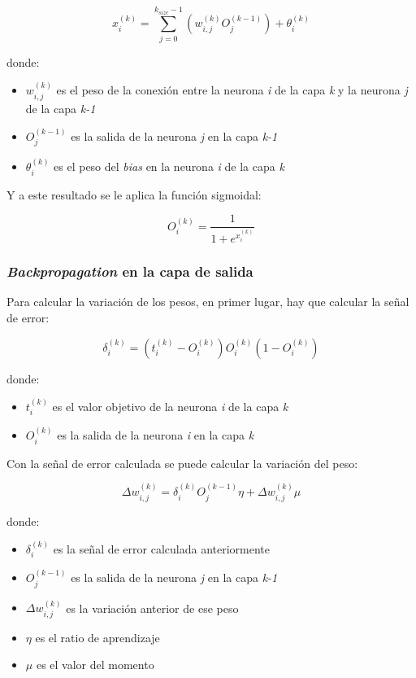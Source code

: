\[ x^{(k)}_{i} = \sum_{j=0}^{k_{size}-1}(w^{(k)}_{i,j} O^{(k-1)}_{j}) + \theta^{(k)}_{i} \]

donde:
\begin{itemize}
	\item $ w^{(k)}_{i,j} $ es el peso de la conexión entre la neurona \textit{i} de la capa \textit{k} y la neurona \textit{j} de la capa \textit{k-1}
	\item $ O^{(k-1)}_{j} $ es la salida de la neurona \textit{j} en la capa \textit{k-1}
	\item $ \theta^{(k)}_{i} $ es el peso del \textit{bias} en la neurona \textit{i} de la capa \textit{k}
\end{itemize}

Y a este resultado se le aplica la función sigmoidal:

\[O^{(k)}_{i} = \dfrac{1}{1 + e^{x^{(k)}_{i}}} \]

\subsubsection{\textit{Backpropagation} en la capa de salida}

Para calcular la variación de los pesos, en primer lugar, hay que calcular la señal de error:

\[ \delta^{(k)}_{i} = (t^{(k)}_{i} - O^{(k)}_{i}) O^{(k)}_{i} (1 - O^{(k)}_{i}) \]

donde:
\begin{itemize}
	\item $ t^{(k)}_{i} $ es el valor objetivo de la neurona \textit{i} de la capa \textit{k}
	\item $ O^{(k)}_{i} $ es la salida de la neurona \textit{i} en la capa \textit{k}
\end{itemize}

Con la señal de error calculada se puede calcular la variación del peso:

\[ \Delta w^{(k)}_{i,j} = \delta^{(k)}_{i} O^{(k-1)}_{j} \eta + \Delta w^{(k)}_{i,j} \mu \]

donde:
\begin{itemize}
	\item $ \delta^{(k)}_{i} $ es la señal de error calculada anteriormente
	\item $ O^{(k-1)}_{j} $ es la salida de la neurona \textit{j} en la capa \textit{k-1}
	\item $ \Delta w^{(k)}_{i,j} $ es la variación anterior de ese peso
	\item $ \eta $ es el ratio de aprendizaje
	\item $ \mu $ es el valor del momento
\end{itemize}

